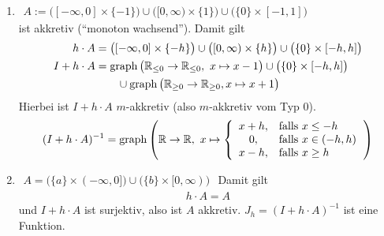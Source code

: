 \begin{beispiel}[Beispiele für $X=\R$]\
	\begin{enumerate}[label=(\alph*)]
		\item $\begin{aligned}
			A:=\big([-\infty,0]\times\lbrace-1\rbrace\big)\cup\big([0,\infty)\times\lbrace 1\rbrace\big)\cup\big(\lbrace0\rbrace\times[-1,1]\big)
		\end{aligned}$\\
		ist akkretiv (``monoton wachsend''). Damit gilt
		\begin{align*}
			h\cdot A&=\big([-\infty,0]\times\lbrace-h\rbrace\big)\cup\big([0,\infty)\times\lbrace h\rbrace\big)\cup\big(\lbrace0\rbrace\times[-h,h]\big)\\
			I+h\cdot A&=\operatorname{graph}\big(\mathbb{R}_{\leq0}\to\mathbb{R}_{\leq0},~x\mapsto x-1\big)\cup\big(\lbrace 0\rbrace\times [-h,h]\big)\\
			&\qquad\cup\operatorname{graph}\big(\mathbb{R}_{\geq0}\to\mathbb{R}_{\geq0},x\mapsto x+1\big)
		\end{align*}
		Hierbei ist $I+h\cdot A$ $m$-akkretiv (also $m$-akkretiv vom Typ 0).
		\begin{align*}
			(I+h\cdot A)^{-1}=\operatorname{graph}\left(\mathbb{R}\to\mathbb{R},~x\mapsto\left\lbrace\begin{array}{cl}
				x+h, & \text{falls } x\leq -h\\
				0, & \text{falls } x\in(-h,h)\\
				x-h, & \text{falls } x\geq h
			\end{array}\right.\right)
		\end{align*}
		\item $\begin{aligned}
			A=\big(\lbrace a\rbrace\times (-\infty,0]\big)\cup\big(\lbrace b\rbrace\times[0,\infty)\big)
		\end{aligned}$
		Damit gilt
		\begin{align*}
			h\cdot A=A
		\end{align*} %
		und $I+h\cdot A$ ist surjektiv, also ist $A$ akkretiv. $J_h=(I+h\cdot A)^{-1}$ ist eine Funktion.
	\end{enumerate}
\end{beispiel}

